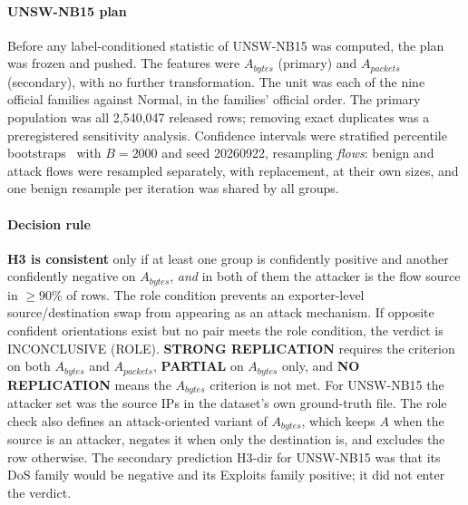 \documentclass[preprint,12pt]{elsarticle}
\begin{document}
\paragraph{UNSW-NB15 plan} Before any label-conditioned statistic of UNSW-NB15 was computed, the plan was frozen and pushed. The features were $A_{bytes}$ (primary) and $A_{packets}$ (secondary), with no further transformation. The unit was each of the nine official families against Normal, in the families' official order. The primary population was all 2{,}540{,}047 released rows; removing exact duplicates was a preregistered sensitivity analysis. Confidence intervals were stratified percentile bootstraps~\cite{efron1979bootstrap} with $B=2000$ and seed 20260922, resampling \emph{flows}: benign and attack flows were resampled separately, with replacement, at their own sizes, and one benign resample per iteration was shared by all groups.

\paragraph{Decision rule} \textbf{H3 is consistent} only if at least one group is confidently positive and another confidently negative on $A_{bytes}$, \emph{and} in both of them the attacker is the flow source in $\ge 90\%$ of rows. The role condition prevents an exporter-level source/destination swap from appearing as an attack mechanism. If opposite confident orientations exist but no pair meets the role condition, the verdict is INCONCLUSIVE (ROLE). \textbf{STRONG REPLICATION} requires the criterion on both $A_{bytes}$ and $A_{packets}$, \textbf{PARTIAL} on $A_{bytes}$ only, and \textbf{NO REPLICATION} means the $A_{bytes}$ criterion is not met. For UNSW-NB15 the attacker set was the source IPs in the dataset's own ground-truth file. The role check also defines an attack-oriented variant of $A_{bytes}$, which keeps $A$ when the source is an attacker, negates it when only the destination is, and excludes the row otherwise. The secondary prediction H3-dir for UNSW-NB15 was that its DoS family would be negative and its Exploits family positive; it did not enter the verdict.
\end{document}
